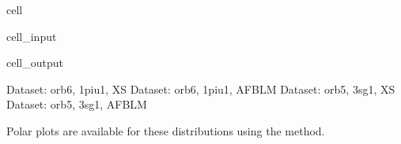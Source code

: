 \documentclass[letterpaper,10pt,english]{jupyterBook}
\begin{document}
\begin{sphinxuseclass}{cell}\begin{sphinxVerbatimInput}

\begin{sphinxuseclass}{cell_input}
\begin{sphinxVerbatim}[commandchars=\\\{\}]
     
\end{sphinxVerbatim}

\end{sphinxuseclass}\end{sphinxVerbatimInput}
\begin{sphinxVerbatimOutput}

\begin{sphinxuseclass}{cell_output}
\begin{sphinxVerbatim}[commandchars=\\\{\}]
Dataset: orb6, 1piu\PYGZhy{}1, XS
Dataset: orb6, 1piu\PYGZhy{}1, AFBLM
Dataset: orb5, 3sg\PYGZhy{}1, XS
Dataset: orb5, 3sg\PYGZhy{}1, AFBLM
\end{sphinxVerbatim}

\noindent{}

\noindent{}

\noindent{}

\noindent{}

\end{sphinxuseclass}\end{sphinxVerbatimOutput}

\end{sphinxuseclass}
\sphinxAtStartPar
Polar plots are available for these distributions using the  method.
\end{document}
